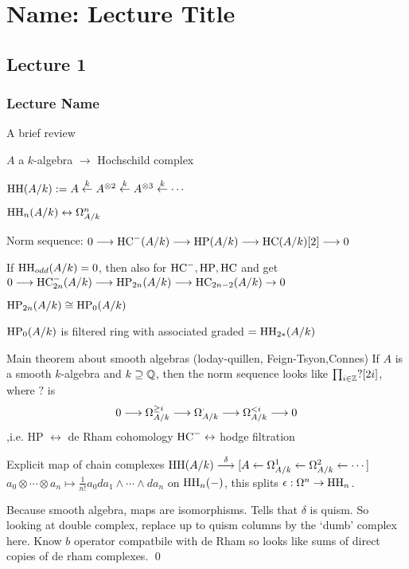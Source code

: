 \newpage
\section{Name: Lecture Title}
\subsection{Lecture 1}
\subsubsection{Lecture Name}
A brief review

$A$ a $k$-algebra $\to$ Hochschild complex

$\operatorname{HH}(A/k):= A \stackrel{k}{\leftarrow} A^{\otimes 2} \stackrel{k}{\leftarrow} A^{\otimes 3} \stackrel{k}{\leftarrow} \cdots$

$\operatorname{HH}_n(A/k) \leftrightarrow \Omega^n_{A/k}$


Norm sequence: $0 \stackrel{}{\longrightarrow} \operatorname{HC}^-(A/k) \stackrel{}{\longrightarrow} \operatorname{HP}(A/k) \stackrel{}{\longrightarrow} \operatorname{HC} (A/k)[2] \stackrel{}{\longrightarrow} 0$

If $\operatorname{HH}_{odd}(A/k)=0$, then also for $\operatorname{HC}^-,\operatorname{HP},\operatorname{HC}$ and get
$0 \stackrel{}{\longrightarrow} \operatorname{HC}^-_{2n}(A/k) \stackrel{}{\longrightarrow} \operatorname{HP}_{2n}(A/k) \stackrel{}{\longrightarrow} \operatorname{HC}_{2n-2}(A/k) \to 0$

$\operatorname{HP}_{2n}(A/k) \cong \operatorname{HP}_0(A/k)$

$\operatorname{HP}_0(A/k)$ is filtered ring with associated graded $= \operatorname{HH}_{2*}(A/k)$


Main theorem about smooth algebras (loday-quillen, Feign-Tsyon,Connes) If $A$ is a smooth $k$-algebra and $k \supseteq \mathbb{Q}$, then the norm sequence looks like $\prod_{i \in \mathbb{Z}} ?[2i]$, where $?$ is 
	\[
	0 \stackrel{}{\longrightarrow} \Omega_{A/k}^{\geq i} \stackrel{}{\longrightarrow} \Omega_{A/k}^\cdot \stackrel{}{\longrightarrow} \Omega_{A/k}^{<i} \stackrel{}{\longrightarrow} 0
	\]
,i.e. HP $\leftrightarrow$ de Rham cohomology 
$\operatorname{HC}^- \leftrightarrow$ hodge filtration

\pf Explicit map of chain complexes 
$\operatorname{HH}(A/k) \stackrel{\delta}{\longrightarrow} [A \leftarrow \Omega_{A/k}^1 \leftarrow \Omega_{A/k}^2 \leftarrow \cdots]$
$a_0 \otimes \cdots \otimes a_n \mapsto \frac{1}{n!} a_0 da_1 \wedge \cdots \wedge da_n$
on $\operatorname{HH}_n(-)$, this splits $\epsilon: \Omega^n \to \operatorname{HH}_n$. 


Because smooth algebra, maps are isomorphisms. Tells that $\delta$ is quism. So looking at double complex, replace up to quism  columns by the `dumb' complex here. Know $b$ operator compatbile with de Rham so looks like sums of direct copies of de rham complexes. \qed 


